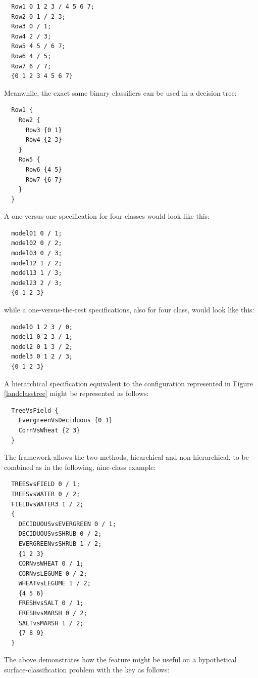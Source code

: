 \begin{verbatim}
  Row1 0 1 2 3 / 4 5 6 7;
  Row2 0 1 / 2 3;
  Row3 0 / 1;
  Row4 2 / 3;
  Row5 4 5 / 6 7;
  Row6 4 / 5;
  Row7 6 / 7;
  {0 1 2 3 4 5 6 7}
\end{verbatim}

Meanwhile, the exact same binary classifiers can be used in
a decision tree: 

\begin{verbatim}
  Row1 {
    Row2 {
      Row3 {0 1}
      Row4 {2 3}
    }
    Row5 {
      Row6 {4 5}
      Row7 {6 7}
    }
  }
\end{verbatim}

A one-versus-one specification for four classes would look like
this:

\begin{verbatim}
  model01 0 / 1;
  model02 0 / 2;
  model03 0 / 3;
  model12 1 / 2;
  model13 1 / 3;
  model23 2 / 3;
  {0 1 2 3}
\end{verbatim}

while a one-versus-the-rest specifications, also for four class, would look
like this:

\begin{verbatim}
  model0 1 2 3 / 0;
  model1 0 2 3 / 1;
  model2 0 1 3 / 2;
  model3 0 1 2 / 3;
  {0 1 2 3}
\end{verbatim}

A hierarchical specification
equivalent to the configuration represented in Figure \ref{landclasstree}
might be represented as follows:

\begin{verbatim}
  TreeVsField {
    EvergreenVsDeciduous {0 1}
    CornVsWheat {2 3}
  }
\end{verbatim}

The framework allows the two methods,
 hiearchical and non-hierarchical, 
to be combined
as in the following, nine-class example:

\begin{verbatim}
  TREESvsFIELD 0 / 1;
  TREESvsWATER 0 / 2;
  FIELDvsWATER3 1 / 2;
  {
    DECIDUOUSvsEVERGREEN 0 / 1;
    DECIDUOUSvsSHRUB 0 / 2;
    EVERGREENvsSHRUB 1 / 2;
    {1 2 3}
    CORNvsWHEAT 0 / 1;
    CORNvsLEGUME 0 / 2;
    WHEATvsLEGUME 1 / 2;
    {4 5 6}
    FRESHvsSALT 0 / 1;
    FRESHvsMARSH 0 / 2;
    SALTvsMARSH 1 / 2;
    {7 8 9}
  }
\end{verbatim}

The above demonstrates how the feature might be useful
on a hypothetical surface-classification problem with the key as follows:

